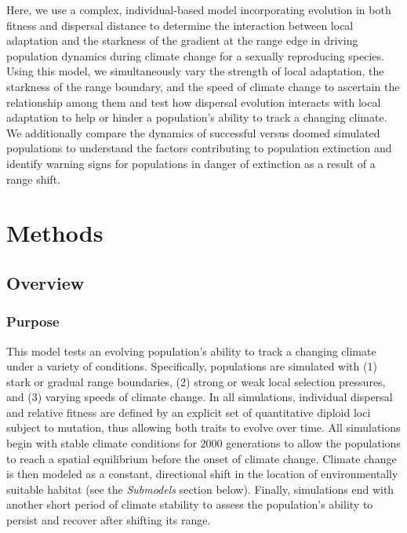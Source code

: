 \documentclass[11pt, oneside]{article}
\begin{document}
Here, we use a complex, individual-based model incorporating evolution in both fitness and dispersal distance to determine the interaction between local adaptation and the starkness of the gradient at the range edge in driving population dynamics during climate change for a sexually reproducing species. Using this model, we simultaneously vary the strength of local adaptation, the starkness of the range boundary, and the speed of climate change to ascertain the relationship among them and test how dispersal evolution interacts with local adaptation to help or hinder a population's ability to track a changing climate. We additionally compare the dynamics of successful versus doomed simulated populations to understand the factors contributing to population extinction and identify warning signs for populations in danger of extinction as a result of a range shift.

\section{Methods}
\subsection{Overview}
\subsubsection{Purpose}
This model tests an evolving population's ability to track a changing climate under a variety of conditions. Specifically, populations are simulated with (1) stark or gradual range boundaries, (2) strong or weak local selection pressures, and (3) varying speeds of climate change. In all simulations, individual dispersal and relative fitness are defined by an explicit set of quantitative diploid loci subject to mutation, thus allowing both traits to evolve over time. All simulations begin with stable climate conditions for $2000$ generations to allow the populations to reach a spatial equilibrium before the onset of climate change. Climate change is then modeled as a constant, directional shift in the location of environmentally suitable habitat (see the \textit{Submodels} section below). Finally, simulations end with another short period of climate stability to assess the population's ability to persist and recover after shifting its range.
\end{document}
